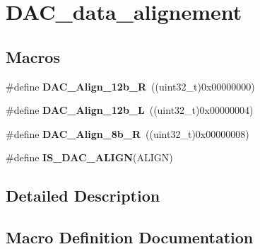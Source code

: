 \hypertarget{group___d_a_c__data__alignement}{}\section{D\+A\+C\+\_\+data\+\_\+alignement}
\label{group___d_a_c__data__alignement}
\subsection*{Macros}
\begin{DoxyCompactItemize}
\item 
\hypertarget{group___d_a_c__data__alignement_ga0f2a6fc71aaf90a27b0caf1bd06e73f2}{}\#define {\bfseries D\+A\+C\+\_\+\+Align\+\_\+12b\+\_\+\+R}~((uint32\+\_\+t)0x00000000)\label{group___d_a_c__data__alignement_ga0f2a6fc71aaf90a27b0caf1bd06e73f2}

\item 
\hypertarget{group___d_a_c__data__alignement_gaf3a46d37092eac0d4c9c1039e68208d4}{}\#define {\bfseries D\+A\+C\+\_\+\+Align\+\_\+12b\+\_\+\+L}~((uint32\+\_\+t)0x00000004)\label{group___d_a_c__data__alignement_gaf3a46d37092eac0d4c9c1039e68208d4}

\item 
\hypertarget{group___d_a_c__data__alignement_gaa633fbcf85e97e12c4894eaed530dd8f}{}\#define {\bfseries D\+A\+C\+\_\+\+Align\+\_\+8b\+\_\+\+R}~((uint32\+\_\+t)0x00000008)\label{group___d_a_c__data__alignement_gaa633fbcf85e97e12c4894eaed530dd8f}

\item 
\#define {\bfseries I\+S\+\_\+\+D\+A\+C\+\_\+\+A\+L\+I\+G\+N}(A\+L\+I\+G\+N)
\end{DoxyCompactItemize}


\subsection{Detailed Description}


\subsection{Macro Definition Documentation}
\hypertarget{group___d_a_c__data__alignement_ga7779c36606827a6a2c4423414a441bde}{}
